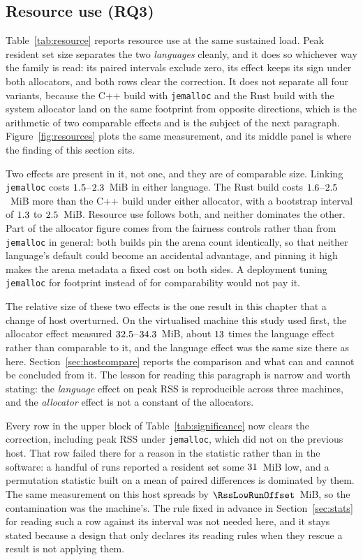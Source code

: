 \documentclass[english,oneside,a4paper,censored,csm,software-track-2020]{HYthesisML}
\begin{document}
\subsection{Resource use (RQ3)}\label{sec:resources}
Table~\ref{tab:resource} reports resource use at the same
sustained load. Peak resident set size separates the two \emph{languages} cleanly, and it does so
whichever way the family is read: its paired intervals exclude zero, its effect keeps its sign under
both allocators, and both rows clear the correction. It does not separate all four variants, because
the C++ build with \texttt{jemalloc} and the Rust build with the system allocator land on the same
footprint from opposite directions, which is the arithmetic of two comparable effects and is the
subject of the next paragraph. Figure~\ref{fig:resources} plots the same measurement, and its middle
panel is where the finding of this section sits.

Two effects are present in it, not one, and they are of comparable size. Linking
\texttt{jemalloc} costs $1.5$--$2.3$~MiB in either language. The Rust
build costs $1.6$--$2.5$~MiB more than the C++ build under either allocator,
with a bootstrap interval of $1.3$ to $2.5$~MiB. Resource use follows both, and
neither dominates the other. Part of the allocator figure comes from the fairness controls rather
than from \texttt{jemalloc} in general: both builds pin the arena count identically, so that
neither language's default could become an accidental advantage, and pinning it high makes the
arena metadata a fixed cost on both sides. A deployment tuning \texttt{jemalloc} for footprint
instead of for comparability would not pay it.

The relative size of these two effects is the one result in this chapter that a change of host
overturned. On the virtualised machine this study used first, the allocator effect measured
$32.5$--$34.3$~MiB, about $13$ times the language
effect rather than comparable to it, and the language effect was the same size there as here.
Section~\ref{sec:hostcompare} reports the comparison and what can and cannot be concluded from it.
The lesson for reading this paragraph is narrow and worth stating: the \emph{language} effect on
peak RSS is reproducible across three machines, and the \emph{allocator} effect is not a constant
of the allocators.

Every row in the upper block of Table~\ref{tab:significance} now clears the correction, including
peak RSS under \texttt{jemalloc}, which did not on the previous host. That row failed there for a
reason in the statistic rather than in the software: a handful of runs reported a resident set some
$31$~MiB low, and a permutation statistic built on a mean of paired differences
is dominated by them. The same measurement on this host spreads by $\RssLowRunOffset$~MiB, so the
contamination was the machine's. The rule fixed in advance in Section~\ref{sec:stats} for reading
such a row against its interval was not needed here, and it stays stated because a design that only
declares its reading rules when they rescue a result is not applying them.
\end{document}
